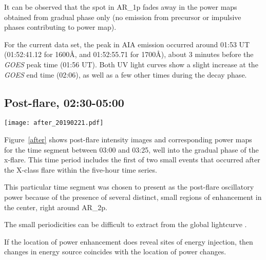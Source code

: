 It can be observed that the spot in AR\_1p fades away in the power maps
obtained from gradual phase only (no emission from precursor or impulsive
phases contributing to power map).


For the current data set, the peak in AIA emission occurred around
01:53 UT (01:52:41.12 for 1600\AA{}, and 01:52:55.71 for 1700\AA{}),
about 3 minutes before the \textit{GOES} peak time (01:56 UT).
Both UV light curves show a slight increase at the \textit{GOES} end time
(02:06), as well as a few other times during the decay phase.



\subsection{Post-flare, 02:30-05:00}

\begin{figure*}[htb!]\centering
    \texttt{[image: after\_20190221.pdf]}
    \caption{%
        Same as Figure~\ref{before},
        after the X-class flare between
        03:00 and 03:25 UT on 15 February 2011.
        \label{after}}
\end{figure*}

Figure~\ref{after}
shows post-flare intensity images and corresponding power maps for
the time segment between 03:00 and 03:25,
well into the gradual phase of the x-flare.
This time period includes the first of two small events that occurred
after the X-class flare within the five-hour time series.

This particular time segment was chosen to present as the post-flare
oscillatory power because of the presence of several distinct, small
regions of enhancement in the center,
right around AR\_2p.






%


The small periodicities can be difficult to extract from the global
lightcurve \citep{VanDoorsselaere2016}.

If the location of power enhancement does reveal sites of energy injection,
then  changes in energy source coincides
with the location of power changes.



